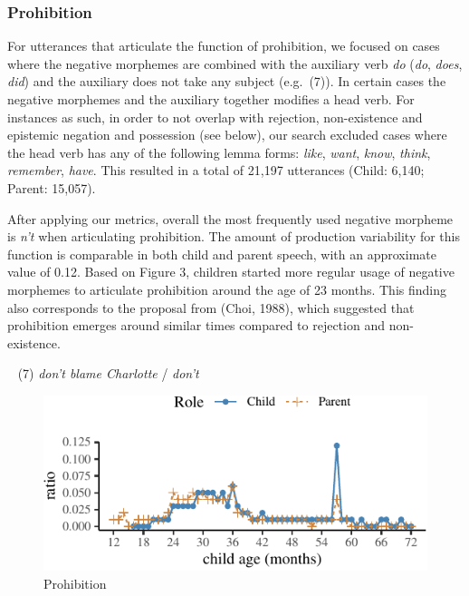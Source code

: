 \documentclass[10pt, letterpaper]{article}
\newenvironment{CodeChunk}{}{}
\begin{document}
\hypertarget{prohibition}{%
\subsubsection{Prohibition}\label{prohibition}}

For utterances that articulate the function of prohibition, we focused
on cases where the negative morphemes are combined with the auxiliary
verb \emph{do} (\emph{do}, \emph{does}, \emph{did}) and the auxiliary
does not take any subject (e.g.~(7)). In certain cases the negative
morphemes and the auxiliary together modifies a head verb. For instances
as such, in order to not overlap with rejection, non-existence and
epistemic negation and possession (see below), our search excluded cases
where the head verb has any of the following lemma forms: \emph{like},
\emph{want}, \emph{know}, \emph{think}, \emph{remember}, \emph{have}.
This resulted in a total of 21,197 utterances (Child: 6,140; Parent:
15,057).

After applying our metrics, overall the most frequently used negative
morpheme is \emph{n't} when articulating prohibition. The amount of
production variability for this function is comparable in both child and
parent speech, with an approximate value of 0.12. Based on Figure 3,
children started more regular usage of negative morphemes to articulate
prohibition around the age of 23 months. This finding also corresponds
to the proposal from (Choi, 1988), which suggested that prohibition
emerges around similar times compared to rejection and non-existence.

~ (7) \emph{don't blame Charlotte} / \emph{don't}

\begin{CodeChunk}
\begin{figure}[H]

{\centering \includegraphics{figs/prohibition-1} 

}

\caption[Prohibition]{Prohibition}\label{fig:prohibition}
\end{figure}
\end{CodeChunk}
\end{document}
